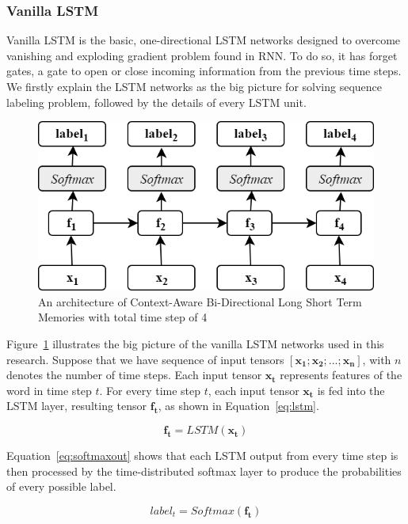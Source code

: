 \subsubsection{Vanilla LSTM}
Vanilla LSTM is the basic, one-directional LSTM networks designed to overcome vanishing and exploding gradient problem found in RNN. To do so, it has forget gates, a gate to open or close incoming information from the previous time steps. We firstly explain the LSTM networks as the big picture for solving sequence labeling problem, followed by the details of every LSTM unit. 

\begin{figure}
	\centering
	\includegraphics[width=0.75\linewidth]{images/olstm}
	\caption{An architecture of Context-Aware Bi-Directional Long Short Term Memories with total time step of 4}
	\label{fig:olstm}
\end{figure}

Figure~\ref{fig:olstm} illustrates the big picture of the vanilla LSTM networks used in this research. Suppose that we have sequence of input tensors $[\mathbf{x_{1}}; \mathbf{x_{2}}; ...; \mathbf{x_{n}}]$, with $n$ denotes the number of time steps. Each input tensor $\mathbf{x_{t}}$ represents features of the word in time step $t$. For every time step $t$, each input tensor $\mathbf{x_{t}}$ is fed into the LSTM layer, resulting tensor $\mathbf{f_{t}}$, as shown in Equation~\ref{eq:lstm}. 

\begin{equation}
\label{eq:lstm}
\mathbf{f_{t}} = LSTM(\mathbf{x_{t}})
\end{equation}

Equation~\ref{eq:softmaxout} shows that each LSTM output from every time step is then processed by the time-distributed softmax layer to produce the probabilities of every possible label.

\begin{equation}
\label{eq:softmaxout}
label_{t} = Softmax(\mathbf{f_{t}})
\end{equation}

